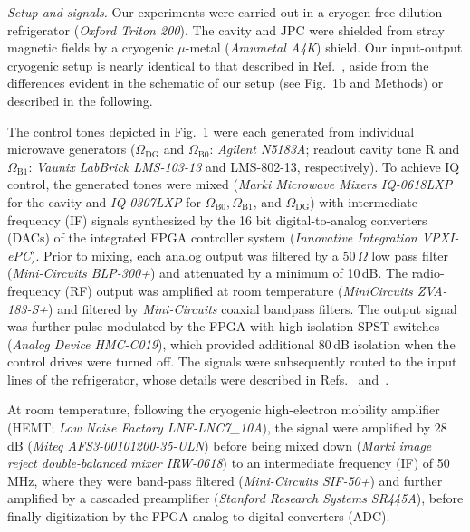 \documentclass[
	 			preprint,     		superscriptaddress, 																longbibliography,
		amsmath, amssymb,
		aps,  prb,   		floatfix,
		linenumbers     
	]{revtex4-1}
\newcommand{\onlineciteMethods}{\onlinecite}
\begin{document}
\textit{Setup and signals.} Our experiments were carried out in a cryogen-free dilution refrigerator (\textit{Oxford Triton 200}). The cavity and JPC were shielded from stray magnetic fields by a cryogenic $\mu$-metal (\textit{Amumetal A4K}) shield. Our input-output cryogenic setup is nearly identical to that described in Ref.~, aside from the differences evident in the schematic of our setup (see Fig.~1b and Methods) or described in the following.

The control tones depicted in Fig.~1 were each generated from  individual microwave generators ($\Omega_\mathrm{DG}$ and $\Omega_\mathrm{B0}$: \textit{Agilent N5183A}; readout cavity tone R and $\Omega_\mathrm{B1}$: \textit{Vaunix LabBrick LMS-103-13} and LMS-802-13, respectively). To achieve IQ control, the generated tones were mixed (\textit{Marki Microwave Mixers IQ-0618LXP} for the cavity and \textit{IQ-0307LXP} for $\Omega_\mathrm{B0}, \Omega_\mathrm{B1}$, and $\Omega_\mathrm{DG}$) with intermediate-frequency (IF) signals synthesized by the 16 bit digital-to-analog converters (DACs) of the integrated FPGA controller system (\textit{Innovative Integration VPXI-ePC}). Prior to mixing, each analog output was filtered by a $50\,\Omega$ low pass filter (\textit{Mini-Circuits BLP-300+}) and attenuated by a minimum of 10\,dB.
The radio-frequency (RF) output was amplified at room temperature (\textit{MiniCircuits ZVA-183-S+}) and filtered by \textit{Mini-Circuits} coaxial bandpass filters.
The output signal was further pulse modulated by the FPGA with high isolation SPST switches (\textit{Analog Device HMC-C019}), which provided additional 80\,dB isolation when the control drives were turned off.
The signals were subsequently routed to the input lines of the refrigerator, whose details were described in Refs.~ and~\onlineciteMethods{Minev2016}.

At room temperature, following the cryogenic high-electron mobility amplifier (HEMT;  \textit{Low Noise Factory LNF-LNC7\_10A}), the signal were amplified by 28\,dB (\textit{Miteq AFS3-00101200-35-ULN}) before being mixed down (\textit{Marki image reject double-balanced mixer IRW-0618}) to an intermediate frequency (IF) of 50\,MHz, where they were band-pass filtered (\textit{Mini-Circuits SIF-50+}) and further amplified by a cascaded preamplifier (\textit{Stanford Research Systems SR445A}), before finally digitization by the FPGA analog-to-digital converters (ADC).
\end{document}
